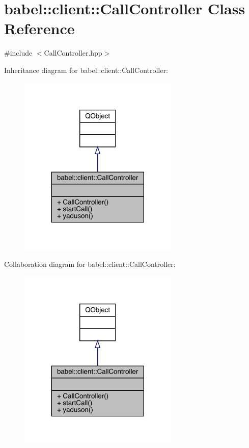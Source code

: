 \hypertarget{classbabel_1_1client_1_1_call_controller}{}\section{babel\+:\+:client\+:\+:Call\+Controller Class Reference}
\label{classbabel_1_1client_1_1_call_controller}


{\ttfamily \#include $<$Call\+Controller.\+hpp$>$}



Inheritance diagram for babel\+:\+:client\+:\+:Call\+Controller\+:\nopagebreak
\begin{figure}[H]
\begin{center}
\leavevmode
\includegraphics[width=216pt]{classbabel_1_1client_1_1_call_controller__inherit__graph}
\end{center}
\end{figure}


Collaboration diagram for babel\+:\+:client\+:\+:Call\+Controller\+:\nopagebreak
\begin{figure}[H]
\begin{center}
\leavevmode
\includegraphics[width=216pt]{classbabel_1_1client_1_1_call_controller__coll__graph}
\end{center}
\end{figure}
